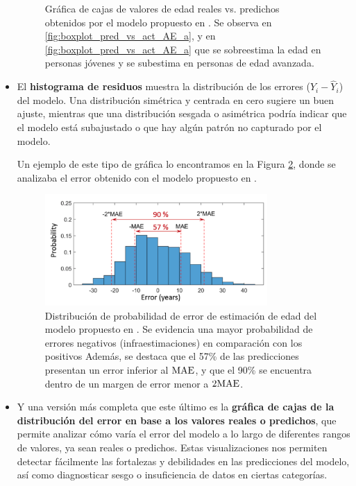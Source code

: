 \begin{itemize}
\begin{figure}[h]
        \caption{Gráfica de cajas de valores de edad reales vs. predichos obtenidos por el modelo propuesto en \cite{stepanovsky2024}.
        Se observa en \ref{fig:boxplot_pred_vs_act_AE_a}, 
        y en \ref{fig:boxplot_pred_vs_act_AE_a} que se sobreestima la edad en personas jóvenes y se subestima en personas de edad avanzada.}
        \label{fig:boxplot_pred_vs_act_AE}
    \end{figure}

    \item El \textbf{histograma de residuos} muestra la distribución de los errores (\(Y_i - \hat{Y}_i\)) del 
    modelo. Una distribución simétrica y centrada en cero sugiere un buen ajuste, mientras que una distribución 
    sesgada o asimétrica podría indicar que el modelo está subajustado o que hay algún patrón no capturado por el 
    modelo. 

    Un ejemplo de este tipo de gráfica lo encontramos en la Figura \ref{fig:prob_dist_AEerror}, 
    donde se analizaba el error obtenido con el modelo propuesto en \cite{stepanovsky2024}.

    \begin{figure}[h]
        \centering
        \includegraphics[width=0.8\textwidth]{capitulos/cap_02/imagenes/prob_distribution_AEerror.png}
        \caption{Distribución de probabilidad de error de estimación de edad del modelo propuesto en 
        \cite{stepanovsky2024}. Se evidencia una mayor probabilidad de errores negativos (infraestimaciones) 
        en comparación con los positivos Además, se destaca que el 57\% de las predicciones presentan un 
        error inferior al $\textnormal{MAE}$, y que el 90\% se encuentra dentro de un margen de error menor a 
        $2\textnormal{MAE}$.
        } 
        \label{fig:prob_dist_AEerror}
    \end{figure}


    \item Y una versión más completa que este último es la \textbf{gráfica de cajas de la distribución del error 
    en base a los valores reales o predichos}, que permite analizar cómo varía el error del modelo a lo largo de 
    diferentes rangos de valores, ya sean reales o predichos. Estas visualizaciones nos permiten detectar 
    fácilmente las fortalezas y debilidades en las predicciones del modelo, así como diagnosticar sesgo o 
    insuficiencia de datos en ciertas categorías.
    

\end{itemize}
